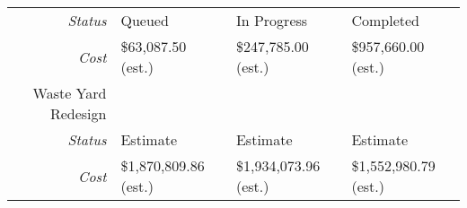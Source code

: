 \begin{tabularx}{\textwidth}{r|X|X|X|}
\multicolumn{1}{|r|}{\cellcolor{ccorangelight}\textit{Status}}                & Queued                                                         & In Progress                                                         & Completed                                                         \\
\multicolumn{1}{|r|}{\cellcolor{ccorangelight}\textit{Cost}}                  & \$63,087.50  (est.)                                                     & \$247,785.00 (est.)                                                     & \$957,660.00  (est.)                                                     \\ \hline
\multicolumn{1}{|V{.2\columnwidth}|}{\cellcolor{ccorangelight}Waste Yard Redesign}          &                                                                  &                                                                  &                                                                  \\
\multicolumn{1}{|r|}{\cellcolor{ccorangelight}\textit{Status}}                & Estimate                                                         & Estimate                                                         & Estimate                                                         \\
\multicolumn{1}{|r|}{\cellcolor{ccorangelight}\textit{Cost}}                  & \$1,870,809.86  (est.)                                                     & \$1,934,073.96  (est.)                                                     & \$1,552,980.79  (est.)                                                     \\ \hline
\end{tabularx}